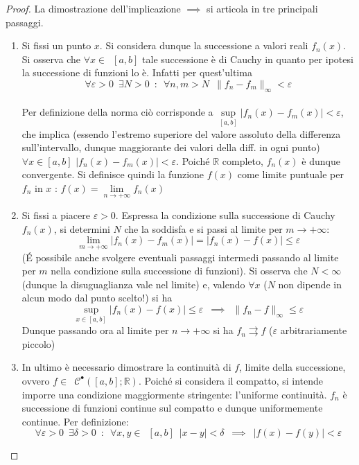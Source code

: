 \documentclass[10pt]{article}
\theoremstyle{plain}
\begin{document}
\begin{proof}
La dimostrazione dell'implicazione $\implies$ si articola in tre principali passaggi.
\begin{enumerate}
\item Si fissi un punto $x$. Si considera dunque la successione a valori reali $f_n(x)$. Si osserva che $\forall x \in \enspace [a,b]$ tale successione è di Cauchy in quanto per ipotesi la successione di funzioni lo è. Infatti per quest'ultima
\[\forall \varepsilon > 0 \enspace \exists N > 0 \enspace : \enspace \forall n,m > N \enspace \|f_n - f_m\|_\infty < \varepsilon\]
\\Per definizione della norma ciò corrisponde a $\displaystyle \sup\limits_{[a,b]}|f_n(x) - f_m(x)| < \varepsilon$, che implica (essendo l'estremo superiore del valore assoluto della differenza sull'intervallo, dunque maggiorante dei valori della diff. in ogni punto) $\forall x \in [a,b]$ $|f_n(x) - f_m(x)| < \varepsilon$. Poiché $\mathbb{R}$ completo, $f_n(x)$ è dunque convergente. Si definisce quindi la funzione $f(x)$ come limite puntuale per $f_n$ in $x$ : $\displaystyle f(x) = \lim\limits_{n \rightarrow +\infty} f_n(x)$
\item Si fissi a piacere $\varepsilon > 0$. Espressa la condizione sulla successione di Cauchy $f_n(x)$, si determini $N$ che la soddisfa e si passi al limite per $m \rightarrow + \infty$:
\[\lim\limits_{m \rightarrow +\infty}|f_n(x) - f_m(x)| = |f_n(x) - f(x)| \leq \varepsilon\]
(\'E possibile anche svolgere eventuali passaggi intermedi passando al limite per $m$ nella condizione sulla successione di funzioni). Si osserva che $N < \infty$ (dunque la disuguaglianza vale nel limite) e, valendo $\forall x$ ($N$ non dipende in alcun modo dal punto scelto!) si ha
\[\sup\limits_{\displaystyle x \in [a,b]}|f_n(x) - f(x)| \leq \varepsilon \enspace \implies \enspace \|f_n - f\|_\infty \leq \varepsilon\]
Dunque passando ora al limite per $n \rightarrow +\infty$ si ha $f_n \rightrightarrows f$ ($\varepsilon$ arbitrariamente piccolo)
\item In ultimo è necessario dimostrare la continuità di $f$, limite della successione, ovvero $f \in \enspace \mathcal{C}^{•}([a,b] ; \mathbb{R})$. Poiché si considera il compatto, si intende imporre una condizione maggiormente stringente: l'uniforme continuità. $f_n$ è successione di funzioni continue sul compatto e dunque uniformemente continue. Per definizione:
\[\forall \varepsilon > 0 \enspace \exists \delta > 0 \enspace : \enspace \forall x, y \in \enspace [a,b] \enspace |x - y| < \delta \enspace \implies \enspace |f(x) - f(y)| < \varepsilon\]

\end{enumerate}
\end{proof}
\end{document}
